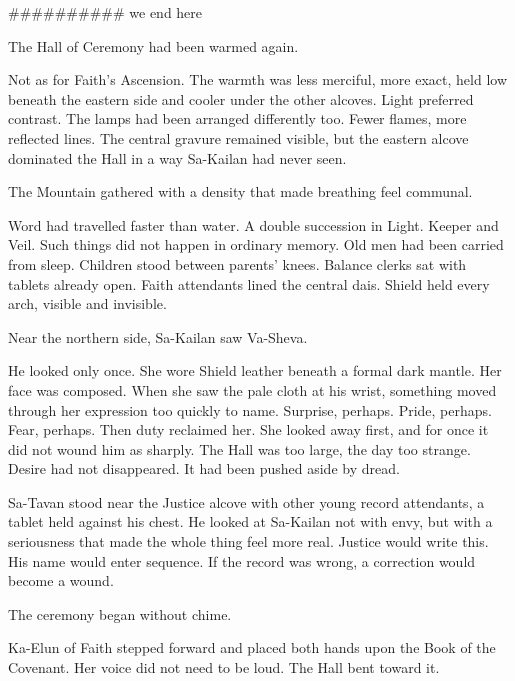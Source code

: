 ########## we end here

The Hall of Ceremony had been warmed again.\par

Not as for Faith’s Ascension. The warmth was less merciful, more exact, held low beneath the eastern side and cooler under the other alcoves. Light preferred contrast. The lamps had been arranged differently too. Fewer flames, more reflected lines. The central gravure remained visible, but the eastern alcove dominated the Hall in a way Sa-Kailan had never seen.\par

The Mountain gathered with a density that made breathing feel communal.\par

Word had travelled faster than water. A double succession in Light. Keeper and Veil. Such things did not happen in ordinary memory. Old men had been carried from sleep. Children stood between parents’ knees. Balance clerks sat with tablets already open. Faith attendants lined the central dais. Shield held every arch, visible and invisible.\par

Near the northern side, Sa-Kailan saw Va-Sheva.\par

He looked only once. She wore Shield leather beneath a formal dark mantle. Her face was composed. When she saw the pale cloth at his wrist, something moved through her expression too quickly to name. Surprise, perhaps. Pride, perhaps. Fear, perhaps. Then duty reclaimed her. She looked away first, and for once it did not wound him as sharply. The Hall was too large, the day too strange. Desire had not disappeared. It had been pushed aside by dread.\par

Sa-Tavan stood near the Justice alcove with other young record attendants, a tablet held against his chest. He looked at Sa-Kailan not with envy, but with a seriousness that made the whole thing feel more real. Justice would write this. His name would enter sequence. If the record was wrong, a correction would become a wound.\par

The ceremony began without chime.\par

Ka-Elun of Faith stepped forward and placed both hands upon the Book of the Covenant. Her voice did not need to be loud. The Hall bent toward it.\par

